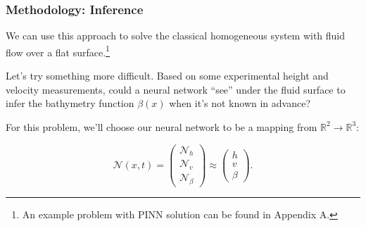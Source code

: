 \begin{frame}
    \frametitle{Methodology: Inference}

    We can use this approach to solve the classical homogeneous system with fluid flow over a flat surface.\footnote{
        An example problem with PINN solution can be found in Appendix A.
    }

    \bigskip
    \pause
    
    Let's try something more difficult. Based on some experimental height and velocity measurements, could a neural 
    network ``see'' under the fluid surface to infer the bathymetry function $\beta(x)$ when it's not known in advance?

    \bigskip
    \pause

    For this problem, we'll choose our neural network to be a mapping from 
    $\mathbb{R}^2 \to \mathbb{R}^3$:

    $$
    \mathcal{N}(x, t) = \begin{pmatrix*}
        \mathcal{N}_h \\
        \mathcal{N}_v \\
        \mathcal{N}_{\beta}
    \end{pmatrix*} \approx \begin{pmatrix*}
        h \\
        v \\
        \beta
    \end{pmatrix*}.
    $$
\end{frame}